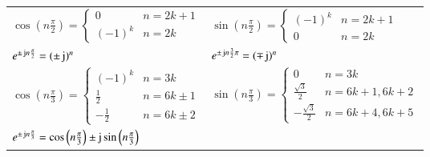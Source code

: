 \begin{center}
    \begin{tabular}{ll}
        $\cos\left(n\frac{\pi}{2}\right) = \begin{cases} 0 & n = 2k+1 \\ (-1)^k & n = 2k \end{cases}$                                                                                                                                &
        $\sin\left(n\frac{\pi}{2}\right) = \begin{cases} (-1)^k & n = 2k+1 \\ 0 & n = 2k \end{cases}$                                                                                                                                  \\
        \noalign{\vspace{0.15cm}}
        $e^{\pm\mathop{} \! \mathrm{j} n\frac{\pi}{2}} = (\pm\mathop{} \! \mathrm{j})^n$                                                                                                                                                                                 &
        $e^{\pm\mathop{} \! \mathrm{j} n\frac{3}{2}\pi} = (\mp\mathop{} \! \mathrm{j})^n$                                                                                                                                                                                  \\
        \noalign{\vspace{0.15cm}}
        $\cos\left(n\frac{\pi}{3}\right) = \begin{cases} (-1)^k & n = 3k \\ \frac{1}{2} & n = 6k \pm 1 \\ -\frac{1}{2} & n = 6k \pm 2 \end{cases}$                                                                                   &
        $\sin\left(n\frac{\pi}{3}\right) = \begin{cases} 0 & n = 3k \\ \frac{\sqrt{3}}{2} & n = 6k+1, 6k+2 \\ -\frac{\sqrt{3}}{2} & n = 6k+4, 6k+5 \end{cases}$                                          \\
        \noalign{\vspace{0.15cm}}
        $e^{\pm\mathop{} \! \mathrm{j} n\frac{\pi}{3}} = \cos\left(n\frac{\pi}{3}\right) \pm \mathop{} \! \mathrm{j} \sin\left(n\frac{\pi}{3}\right)$                                                                                                                    & \\

\end{tabular}
\end{center}
